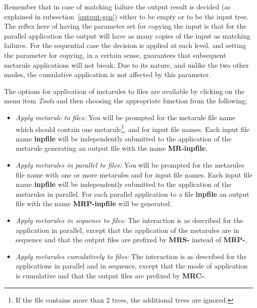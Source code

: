 Remember that in case of matching failure the output result is decided (as 
explained in subsection~\ref{output-gen}) either to be empty or to be the 
input tree. The reflex here of having the parameter set for copying the input 
is that for the parallel application the output will have as many copies of 
the input as matching failures. For the sequential case the decision is applied 
at each level, and setting the parameter for copying, in a certain sense, 
guarantees that subsequent metarule applications will not break. 
Due to its nature, and unlike the two other modes, the cumulative 
application is not affected by this parameter. 
 
The options for application of metarules to files are available by clicking 
on the menu item {\it Tools} and then choosing the appropriate function 
from the following: 
 
\begin{itemize} 
\item   {\it Apply metarule to files:}  
        You will be prompted for the metarule file name which should contain 
        one metarule\footnote{If the file contains more than 2 trees, the         additional trees are ignored.}, and for input file names.  Each input 
        file name {\bf inpfile} will be independently submitted to the 
        application of the metarule generating an output file with the name 
        {\bf MR-inpfile}. 
 
\item   {\it Apply metarules in parallel to files:} 
        You will be prompted for the metarules file name with one or more 
        metarules and for input file names. 
        Each input file name {\bf inpfile} will be independently submitted to 
        the application of the metarules in parallel. For each parallel 
        application to a file {\bf inpfile} an output file with the 
        name    {\bf MRP-inpfile} will be generated. 
 
\item   {\it Apply metarules in sequence to files:}  
        The interaction is as described for the application in parallel, 
        except that 
        the application of the metarules are in sequence and that 
        the output files are prefixed by {\bf MRS-} instead of {\bf MRP-}. 
 
\item   {\it Apply metarules cumulatively to files:}  
        The interaction is as described for the applications in parallel 
        and in sequence, except that the mode of application is cumulative 
        and that the output files are prefixed by {\bf MRC-}. 
\end{itemize} 
 
